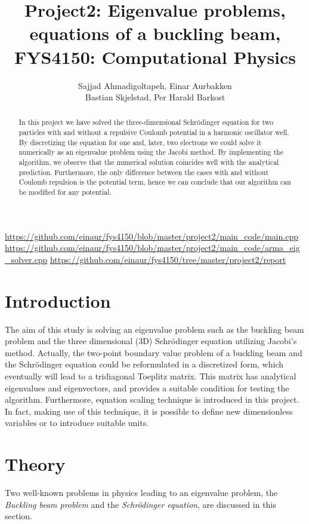 \documentclass[12pt, a4paper, reqno, article]{amsart}
\title[Project2]{Project2: Eigenvalue problems, equations of a buckling beam,\\
  \hrulefill\small{ FYS4150: Computational Physics }\hrulefill}
\author{Sajjad Ahmadigoltapeh, Einar Aurbakken \\ Bastian Skjelstad, Per Harald Barkost}\\
\begin{document}
\begin{titlepage}
\begin{abstract}
In this project we have solved the three-dimensional Schrödinger equation for two particles with and without a repulsive Coulomb potential in a harmonic oscillator well. By discretizing the equation for one and, later, two electrons we could solve it numerically as an eigenvalue problem using the Jacobi method. By implementing the algorithm, we observe that the numerical solution coincides well with the analytical prediction. Furthermore, the only difference between the cases with and without Coulomb repulsion is the potential term, hence we can conclude that our algorithm can be modified for any potential.
\end{abstract}
\begin{center}
\tiny\url{https://github.com/einaur/fys4150/blob/master/project2/main_code/main.cpp}
\tiny\url{https://github.com/einaur/fys4150/blob/master/project2/main_code/arma_eig_solver.cpp}
\tiny\url{https://github.com/einaur/fys4150/tree/master/project2/report}
\end{center}
\maketitle
\tableofcontents
\end{titlepage}

\section{Introduction}

The aim of this study is solving an eigenvalue problem such as the buckling beam problem and the three dimensional (3D) Schrödinger equation utilizing Jacobi's method. Actually, the two-point boundary value problem of a buckling beam and the Schrödinger equation could be reformulated in a discretized form, which eventually will lead to a tridiagonal Toeplitz matrix. This matrix has analytical eigenvalues and eigenvectors, and provides a suitable condition for testing the algorithm. Furthermore, equation scaling technique is introduced in this project. In fact, making use of this technique, it is possible to define new dimensionless variables or to introduce suitable units.

\section{Theory}
Two well-known problems in physics leading to an eigenvalue problem, the \textit{Buckling beam problem} and the \textit{Schrödinger equation}, are discussed in this section.\\
\end{document}
